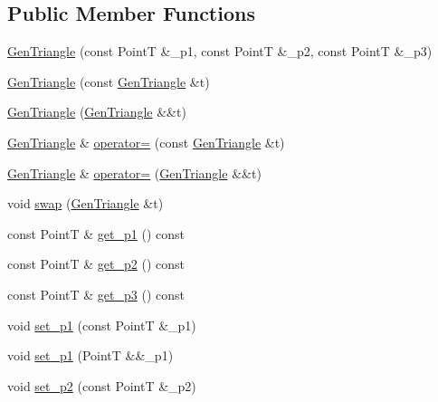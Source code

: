 \subsection*{Public Member Functions}
\begin{DoxyCompactItemize}
\item 
\hyperlink{class_designar_1_1_gen_triangle_abcdb0045637f2ee8b34cf674fc619e04}{Gen\+Triangle} (const PointT \&\+\_\+p1, const PointT \&\+\_\+p2, const PointT \&\+\_\+p3)
\item 
\hyperlink{class_designar_1_1_gen_triangle_a7308aa4e23c9efb2c76d852a96720e46}{Gen\+Triangle} (const \hyperlink{class_designar_1_1_gen_triangle}{Gen\+Triangle} \&t)
\item 
\hyperlink{class_designar_1_1_gen_triangle_a0088e354dd40c4391e291ae02d7ff873}{Gen\+Triangle} (\hyperlink{class_designar_1_1_gen_triangle}{Gen\+Triangle} \&\&t)
\item 
\hyperlink{class_designar_1_1_gen_triangle}{Gen\+Triangle} \& \hyperlink{class_designar_1_1_gen_triangle_ad478eec7295a0823d1061e471e6c5527}{operator=} (const \hyperlink{class_designar_1_1_gen_triangle}{Gen\+Triangle} \&t)
\item 
\hyperlink{class_designar_1_1_gen_triangle}{Gen\+Triangle} \& \hyperlink{class_designar_1_1_gen_triangle_a5c59bfbd92a3114bb243d187d33e46d1}{operator=} (\hyperlink{class_designar_1_1_gen_triangle}{Gen\+Triangle} \&\&t)
\item 
void \hyperlink{class_designar_1_1_gen_triangle_a56928ea4b8436fb98654c791121d5abe}{swap} (\hyperlink{class_designar_1_1_gen_triangle}{Gen\+Triangle} \&t)
\item 
const PointT \& \hyperlink{class_designar_1_1_gen_triangle_ab697f342f213f563049c9f74fcee06a1}{get\+\_\+p1} () const
\item 
const PointT \& \hyperlink{class_designar_1_1_gen_triangle_a77a549a6f5c67ab61298395606f920fa}{get\+\_\+p2} () const
\item 
const PointT \& \hyperlink{class_designar_1_1_gen_triangle_a56dbe16bc096232f2bcc6f95c2e464df}{get\+\_\+p3} () const
\item 
void \hyperlink{class_designar_1_1_gen_triangle_ac00304297a565c88d5f1ab663f00259f}{set\+\_\+p1} (const PointT \&\+\_\+p1)
\item 
void \hyperlink{class_designar_1_1_gen_triangle_af6834f2d91ca020c2cebedc990e9db5d}{set\+\_\+p1} (PointT \&\&\+\_\+p1)
\item 
void \hyperlink{class_designar_1_1_gen_triangle_a866c788d9a7f7cb8c4bde20ceb149408}{set\+\_\+p2} (const PointT \&\+\_\+p2)

\end{DoxyCompactItemize}
